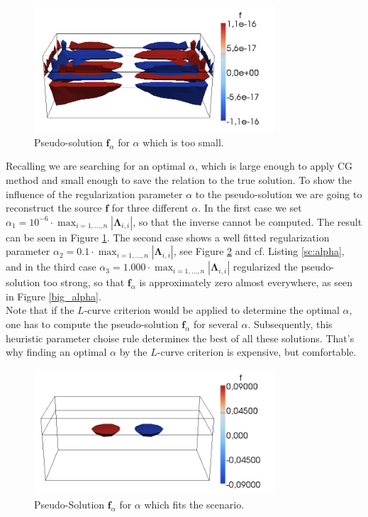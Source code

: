 \documentclass[a4paper, 11pt, twoside]{article}
\begin{document}
\begin{figure}[h!]
	\centering
		\includegraphics[width=0.8\textwidth]{fig/f_inverse_small_alpha.png}
\caption{Pseudo-solution $\boldsymbol{f}_\alpha$ for $\alpha$ which is too small.}
\label{small_alpha}
\end{figure}
%
Recalling we are searching for an optimal $\alpha$, which is large enough to apply CG method and small enough to save the relation to the true solution. To show the influence of the regularization parameter $\alpha$ to the pseudo-solution we are going to reconstruct the source $\boldsymbol{f}$ for three different $\alpha$. In the first case we set $\alpha_1=10^{-6}\cdot\max_{i=1,\ldots,n}|\boldsymbol{\Lambda}_{i,i}|$, so that the inverse cannot be computed. The result can be seen in Figure \ref{small_alpha}. The second case shows a well fitted regularization parameter $\alpha_2=0.1\cdot\max_{i=1,\ldots,n}|\boldsymbol{\Lambda}_{i,i}|$, see Figure \ref{good_alpha} and cf. Listing \ref{sc:alpha}, and in the third case $\alpha_3=1.000\cdot\max_{i=1,\ldots,n}|\boldsymbol{\Lambda}_{i,i}|$ regularized the pseudo-solution too strong, so that $\boldsymbol{f}_\alpha$ is approximately zero almost everywhere, as seen in Figure \ref{big_alpha}.\\
Note that if the $L$-curve criterion would be applied to determine the optimal $\alpha$, one has to compute the pseudo-solution $\boldsymbol{f}_\alpha$ for several $\alpha$. Subsequently, this heuristic parameter choise rule determines the best of all these solutions. That's why finding an optimal $\alpha$ by the $L$-curve criterion is expensive, but comfortable.


\begin{figure}[h!]
	\centering
		\includegraphics[width=0.8\textwidth]{fig/f_inverse_good_alpha.png}
\caption{Pseudo-Solution $\boldsymbol{f}_\alpha$ for $\alpha$ which fits the scenario.}
\label{good_alpha}
\end{figure}
\end{document}
